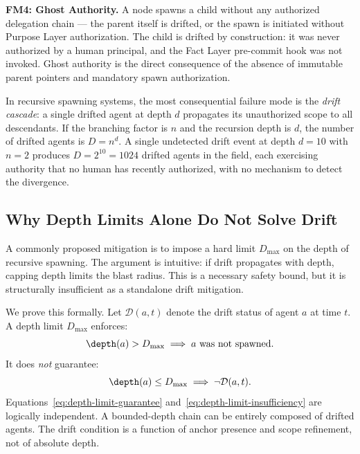 \bigskip
\noindent\textbf{FM4: Ghost Authority.} A node spawns a child without any authorized delegation chain — the parent itself is drifted, or the spawn is initiated without Purpose Layer authorization. The child is drifted by construction: it was never authorized by a human principal, and the Fact Layer pre-commit hook was not invoked. Ghost authority is the direct consequence of the absence of immutable parent pointers and mandatory spawn authorization.

\bigskip
In recursive spawning systems, the most consequential failure mode is the \emph{drift cascade}: a single drifted agent at depth $d$ propagates its unauthorized scope to all descendants. If the branching factor is $n$ and the recursion depth is $d$, the number of drifted agents is $D = n^d$. A single undetected drift event at depth $d=10$ with $n=2$ produces $D = 2^{10} = 1024$ drifted agents in the field, each exercising authority that no human has recently authorized, with no mechanism to detect the divergence.

\subsection{Why Depth Limits Alone Do Not Solve Drift}
\label{sec:rs-depth-limits}

A commonly proposed mitigation is to impose a hard limit $D_{\max}$ on the depth of recursive spawning. The argument is intuitive: if drift propagates with depth, capping depth limits the blast radius. This is a necessary safety bound, but it is structurally insufficient as a standalone drift mitigation.

We prove this formally. Let $\mathcal{D}(a, t)$ denote the drift status of agent $a$ at time $t$. A depth limit $D_{\max}$ enforces:
\begin{equation}
\depth(a) > D_{\max} \implies a \text{ was not spawned.}
\label{eq:depth-limit-guarantee}
\end{equation}
It does \emph{not} guarantee:
\begin{equation}
\depth(a) \leq D_{\max} \implies \neg \mathcal{D}(a, t).
\label{eq:depth-limit-insufficiency}
\end{equation}
Equations~\eqref{eq:depth-limit-guarantee} and~\eqref{eq:depth-limit-insufficiency} are logically independent. A bounded-depth chain can be entirely composed of drifted agents. The drift condition is a function of anchor presence and scope refinement, not of absolute depth.

